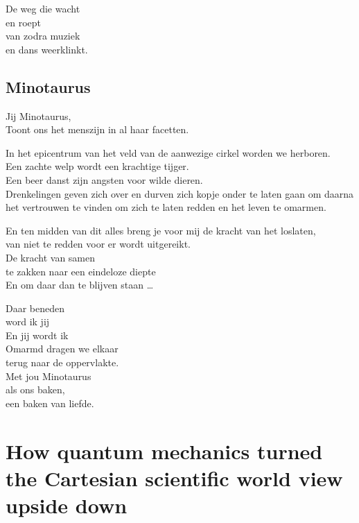 \documentclass[
  11pt,
]{book}
\begin{document}
De weg die wacht\\
en roept\\
van zodra muziek\\
en dans weerklinkt.

\hypertarget{minotaurus}{%
\subsection*{Minotaurus}\label{minotaurus}}

Jij Minotaurus,\\
Toont ons het menszijn in al haar facetten.

In het epicentrum van het veld van de aanwezige cirkel worden we herboren.\\
Een zachte welp wordt een krachtige tijger.\\
Een beer danst zijn angsten voor wilde dieren.\\
Drenkelingen geven zich over en durven zich kopje onder te laten gaan om daarna het vertrouwen te vinden om zich te laten redden en het leven te omarmen.

En ten midden van dit alles breng je voor mij de kracht van het loslaten,\\
van niet te redden voor er wordt uitgereikt.\\
De kracht van samen\\
te zakken naar een eindeloze diepte\\
En om daar dan te blijven staan \ldots{}

Daar beneden\\
word ik jij\\
En jij wordt ik\\
Omarmd dragen we elkaar\\
terug naar de oppervlakte.\\
Met jou Minotaurus\\
als ons baken,\\
een baken van liefde.

\hypertarget{how-quantum-mechanics-turned-the-cartesian-scientific-world-view-upside-down}{%
\section*{How quantum mechanics turned the Cartesian scientific world view upside down}\label{how-quantum-mechanics-turned-the-cartesian-scientific-world-view-upside-down}}
\end{document}
